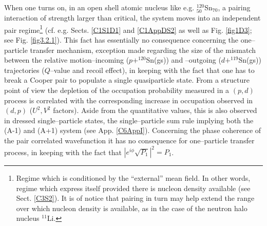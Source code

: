 When one turns on, in an open shell atomic nucleus like e.g. $^{120}_{50}$Sn$_{70}$, a pairing interaction of strength larger than critical, the system moves into an independent pair regime\footnote{Regime which is conditioned by the ``external'' mean field. In other words, regime which express itself provided there is nucleon density available (see Sect. \ref{C3S2}). It is of notice that pairing in turn may help extend the range over which nucleon density is available, as in the case of the neutron halo nucleus $^{11}$Li.} (cf. e.g. Sects. \ref{C1S1D1} and \ref{C1AppDS2} as well as Fig. \ref{fig1D3}; see Fig. \ref{fig3.2.1}). This fact has essentially no consequence concerning the one--particle transfer mechanism, exception made regarding the size of the mismatch between the relative motion--incoming ($p+^{120}$Sn(gs)) and --outgoing ($d+^{119}$Sn(gs)) trajectories ($Q$--value and recoil effect), in keeping with the fact that one has to break a Cooper pair to populate a single  quasiparticle state. From a structure point of view the depletion of the occupation probability measured in a $(p,d)$ process is correlated with the corresponding increase in occupation observed in $(d,p)$ ($U^2,V^2$ factors). Aside  from the quantitative values, this is also observed in dressed single--particle states, the single--particle sum rule implying both the (A-1) and (A+1) system (see App. \ref{C6AppI}). Concerning the phase coherence of the pair correlated wavefunction it has no consequence for one--particle transfer process, in keeping with the fact that $|e^{i\phi}\sqrt{P_1}|^2=P_1$.


